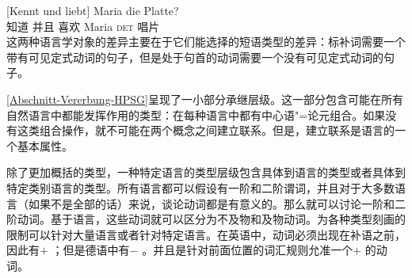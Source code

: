 \ex 
\gll {}[Kennt und liebt] Maria die Platte?\\
	 {}\spacebr{}知道 并且 喜欢 Maria \textsc{det} 唱片\\
\zl
这两种语言学对象的差异主要在于它们能选择的短语类型的差异：标补词需要一个带有可见定式动词的句子，但是处于句首的动词需要一个没有可见定式动词的句子。

\ref{Abschnitt-Vererbung-HPSG}呈现了一小部分承继层级。这一部分包含可能在所有自然语言中都能发挥作用的类型：在每种语言中都有中心语"=论元组合。如果没有这类组合操作，就不可能在两个概念之间建立联系。但是，建立联系是语言的一个基本属性。

除了更加概括的类型，一种特定语言的类型层级包含具体到语言的类型或者具体到特定类别语言的类型。所有语言都可以假设有一阶和二阶谓词，并且对于大多数语言（如果不是全部的话）来说，谈论动词都是有意义的。那么就可以讨论一阶和二阶动词。基于语言，这些动词就可以区分为不及物和及物动词。为各种类型刻画的限制可以针对大量语言或者针对特定语言。在英语中，动词必须出现在补语之前，因此有\initialv $+$ ；但是德语中有\initialv $-$ 。并且是针对前面位置的词汇规则允准一个\initialv $+$ 的动词。

